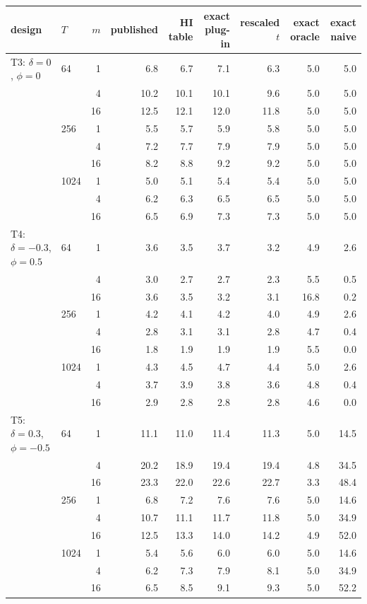 \begin{tabular}{@{}llrrrrrrr@{}}\toprule
design & $T$ & $m$ & published & HI table & exact plug-in & rescaled $t$ & exact oracle & exact naive\\\midrule
T3: $\delta=0$, $\phi=0$ & 64 & 1 & 6.8 & 6.7 & 7.1 & 6.3 & 5.0 & 5.0\\
 &  & 4 & 10.2 & 10.1 & 10.1 & 9.6 & 5.0 & 5.0\\
 &  & 16 & 12.5 & 12.1 & 12.0 & 11.8 & 5.0 & 5.0\\
 & 256 & 1 & 5.5 & 5.7 & 5.9 & 5.8 & 5.0 & 5.0\\
 &  & 4 & 7.2 & 7.7 & 7.9 & 7.9 & 5.0 & 5.0\\
 &  & 16 & 8.2 & 8.8 & 9.2 & 9.2 & 5.0 & 5.0\\
 & 1024 & 1 & 5.0 & 5.1 & 5.4 & 5.4 & 5.0 & 5.0\\
 &  & 4 & 6.2 & 6.3 & 6.5 & 6.5 & 5.0 & 5.0\\
 &  & 16 & 6.5 & 6.9 & 7.3 & 7.3 & 5.0 & 5.0\\
\midrule
T4: $\delta=-0.3$, $\phi=0.5$ & 64 & 1 & 3.6 & 3.5 & 3.7 & 3.2 & 4.9 & 2.6\\
 &  & 4 & 3.0 & 2.7 & 2.7 & 2.3 & 5.5 & 0.5\\
 &  & 16 & 3.6 & 3.5 & 3.2 & 3.1 & 16.8 & 0.2\\
 & 256 & 1 & 4.2 & 4.1 & 4.2 & 4.0 & 4.9 & 2.6\\
 &  & 4 & 2.8 & 3.1 & 3.1 & 2.8 & 4.7 & 0.4\\
 &  & 16 & 1.8 & 1.9 & 1.9 & 1.9 & 5.5 & 0.0\\
 & 1024 & 1 & 4.3 & 4.5 & 4.7 & 4.4 & 5.0 & 2.6\\
 &  & 4 & 3.7 & 3.9 & 3.8 & 3.6 & 4.8 & 0.4\\
 &  & 16 & 2.9 & 2.8 & 2.8 & 2.8 & 4.6 & 0.0\\
\midrule
T5: $\delta=0.3$, $\phi=-0.5$ & 64 & 1 & 11.1 & 11.0 & 11.4 & 11.3 & 5.0 & 14.5\\
 &  & 4 & 20.2 & 18.9 & 19.4 & 19.4 & 4.8 & 34.5\\
 &  & 16 & 23.3 & 22.0 & 22.6 & 22.7 & 3.3 & 48.4\\
 & 256 & 1 & 6.8 & 7.2 & 7.6 & 7.6 & 5.0 & 14.6\\
 &  & 4 & 10.7 & 11.1 & 11.7 & 11.8 & 5.0 & 34.9\\
 &  & 16 & 12.5 & 13.3 & 14.0 & 14.2 & 4.9 & 52.0\\
 & 1024 & 1 & 5.4 & 5.6 & 6.0 & 6.0 & 5.0 & 14.6\\
 &  & 4 & 6.2 & 7.3 & 7.9 & 8.1 & 5.0 & 34.9\\
 &  & 16 & 6.5 & 8.5 & 9.1 & 9.3 & 5.0 & 52.2\\
\bottomrule\end{tabular}
